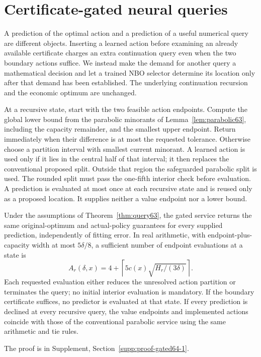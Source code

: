\section{Certificate-gated neural queries}\label{sec:gated64}
A prediction of the optimal action and a prediction of a useful numerical query are different objects. Inserting a learned action before examining an already available certificate charges an extra continuation query even when the two boundary actions suffice. We instead make the demand for another query a mathematical decision and let a trained NBO selector determine its location only after that demand has been established. The underlying continuation recursion and the economic optimum are unchanged.

At a recursive state, start with the two feasible action endpoints. Compute the global lower bound from the parabolic minorants of Lemma~\ref{lem:parabolic63}, including the capacity remainder, and the smallest upper endpoint. Return immediately when their difference is at most the requested tolerance. Otherwise choose a partition interval with smallest current minorant. A learned action is used only if it lies in the central half of that interval; it then replaces the conventional proposed split. Outside that region the safeguarded parabolic split is used. The rounded split must pass the one-fifth interior check before evaluation. A prediction is evaluated at most once at each recursive state and is reused only as a proposed location. It supplies neither a value endpoint nor a lower bound.

\begin{theorem}\label{thm:gated64}
Under the assumptions of Theorem~\ref{thm:query63}, the gated service returns the same original-optimum and actual-policy guarantees for every supplied prediction, independently of fitting error. In real arithmetic, with endpoint-plus-capacity width at most $5\delta/8$, a sufficient number of endpoint evaluations at a state is
\[
 A_r(\delta,x)=4+\left\lceil5c(x)\sqrt{H_r/(3\delta)}\right\rceil.
\]
Each requested evaluation either reduces the unresolved action partition or terminates the query; no initial interior evaluation is mandatory. If the boundary certificate suffices, no predictor is evaluated at that state. If every prediction is declined at every recursive query, the value endpoints and implemented actions coincide with those of the conventional parabolic service using the same arithmetic and tie rules.
\end{theorem}
\noindent The proof is in Supplement, Section~\ref{supp:proof-gated64-1}.


